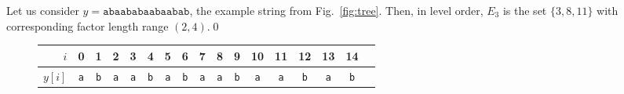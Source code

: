 \documentclass[preprint,12pt]{elsarticle}
\newenvironment{example}[1][Example]{\begin{trivlist}
\item[\hskip \labelsep {\bfseries #1}]}{\end{trivlist}}
\begin{document}
\begin{example}
Let us consider $y=\texttt{abaababaabaabab}$, the example string from Fig.~\ref{fig:tree}. 
Then, in level order, $E_{3}$ is the set $\{3,8,11\}$ with corresponding factor length range $(2,4)$.\qed
\end{example}

\begin{figure}[!t]
\begin{tabular}[t]{@{}r@{\quad}*{16}{c}@{}}
$i$ & 0 & 1 & 2 & 3 & 4 & 5 & 6 & 7 & 8 & 9 & 10 & 11 & 12 & 13 & 14 \\ \hline
$y[i]$&\texttt{a}&\texttt{b}&\texttt{a}&\texttt{a}&\texttt{b}&\texttt{a}&\texttt{b}&\texttt{a}&\texttt{a}&\texttt{b}&\texttt{a}&\texttt{a}&\texttt{b}&\texttt{a}&\texttt{b}\\
\end{tabular}


\end{figure}
\end{document}
